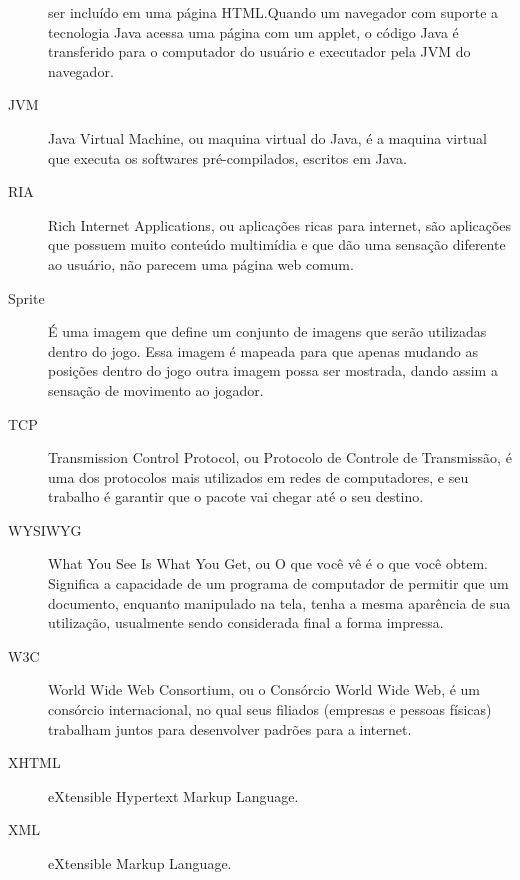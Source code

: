\begin{description}
ser incluído em uma página HTML.Quando um navegador com suporte a
tecnologia Java acessa uma página com um applet, o código Java é
transferido para o computador do usuário e executador pela JVM do
navegador.
\item[JVM ] Java Virtual Machine, ou maquina virtual do Java, é a
maquina virtual que executa os softwares pré-compilados, escritos em
Java.
\item[RIA ] Rich Internet Applications, ou aplicações ricas para
internet, são aplicações que possuem muito conteúdo multimídia e que
dão uma sensação diferente ao usuário, não parecem uma página web
comum.
\item[Sprite ] É uma imagem que define um conjunto de imagens que
serão utilizadas dentro do jogo. Essa imagem é mapeada para que apenas
mudando as posições dentro do jogo outra imagem possa ser mostrada,
dando assim a sensação de movimento ao jogador.
\item[TCP ] Transmission Control Protocol, ou Protocolo de Controle de
Transmissão, é uma dos protocolos mais utilizados em redes de
computadores, e seu trabalho é garantir que o pacote vai chegar até o
seu destino.
\item[WYSIWYG ] What You See Is What You Get, ou O que você vê é o que
você obtem. Significa a capacidade de um programa de computador de
permitir que um documento, enquanto manipulado na tela, tenha a mesma
aparência de sua utilização, usualmente sendo considerada final a
forma impressa.
\item[W3C ] World Wide Web Consortium, ou o Consórcio World Wide Web,
é um consórcio internacional, no qual seus filiados (empresas e
pessoas físicas) trabalham juntos para desenvolver padrões para a
internet.
\item[XHTML ] eXtensible Hypertext Markup Language.
\item[XML ] eXtensible Markup Language.

\end{description}
\newpage
